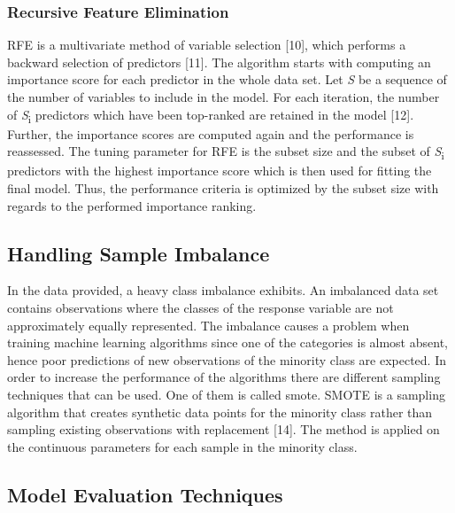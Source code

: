 \documentclass[a4paper]{article}
\begin{document}
\subsubsection{Recursive Feature Elimination}
RFE is a multivariate method of variable selection [10], which performs a backward selection of predictors [11]. The algorithm starts with computing an importance score for each predictor in the whole data set. Let \textit{S} be a sequence of the number of variables to include in the model. For each iteration, the number of \textit{S}\textsubscript{i} predictors which have been top-ranked are retained in the model [12]. Further, the importance scores are computed again and the performance is reassessed. The tuning parameter for RFE is the subset size and the subset of \textit{S}\textsubscript{i} predictors with the highest importance score which is then used for fitting the final model. Thus, the performance criteria is optimized by the subset size with regards to the performed importance ranking.

\subsection{Handling Sample Imbalance}
In the data provided, a heavy class imbalance exhibits. An imbalanced data set contains observations where the classes of the response variable are not approximately equally represented. The imbalance causes a problem when training machine learning algorithms since one of the categories is almost absent, hence poor predictions of new observations of the minority class are expected. In order to increase the performance of the algorithms there are different sampling techniques that can be used. One of them is called \gls{smote}. SMOTE is a sampling algorithm that creates synthetic data points for the minority class rather than sampling existing observations with replacement [14]. The method is applied on the continuous parameters for each sample in the minority class.

\subsection{Model Evaluation Techniques}
\end{document}
